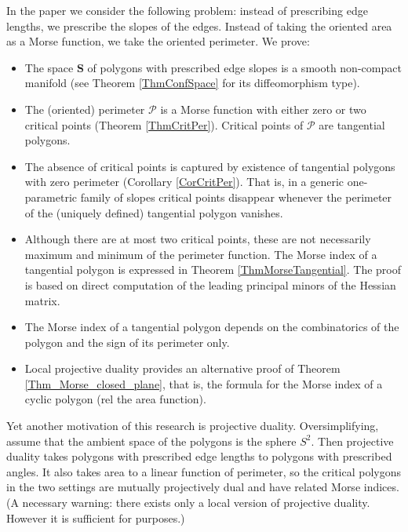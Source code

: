 \documentclass[12pt]{amsart}
\theoremstyle{plain}
\theoremstyle{definition}
\theoremstyle{remark}
\theoremstyle{plain}
\theoremstyle{definition}
\begin{document}
  In the paper we consider the following problem: instead of prescribing edge lengths, we prescribe the slopes of the edges. Instead of taking the oriented area as a Morse function, we take the oriented perimeter. We prove:
 \begin{itemize}
    \item The space $\mathbf{S}$ of polygons with prescribed edge slopes  is a smooth non-compact  manifold (see Theorem \ref{ThmConfSpace} for its diffeomorphism type).
    \item The (oriented) perimeter $\mathcal{P}$ is a Morse function with either zero or  two critical points (Theorem \ref{ThmCritPer}).
    Critical points of $\mathcal{P}$ are{ tangential} polygons.
    \item  The absence of critical points is captured by existence of tangential polygons with zero perimeter (Corollary  \ref{CorCritPer}). That is, in a generic one-parametric family of slopes critical points disappear whenever the perimeter of the (uniquely defined) tangential polygon vanishes.

        \item  Although there are at most two critical points, these are not necessarily maximum and minimum of the perimeter function. The Morse index of a tangential polygon is expressed in Theorem \ref{ThmMorseTangential}. The proof is based on  direct computation of the leading principal minors of the Hessian matrix.
            \item The Morse index of a tangential polygon depends on the combinatorics of the polygon and the sign of its perimeter only.
            \item Local projective duality provides an alternative proof of Theorem \ref{Thm_Morse_closed_plane}, that is, the formula for the Morse index of a cyclic polygon (rel the area function).
  \end{itemize}

  Yet another motivation of this research is projective duality. Oversimplifying, assume that  the ambient space of the polygons is the sphere $S^2$.
Then projective duality takes polygons with prescribed edge lengths to polygons with prescribed angles. It also takes area to a linear function of perimeter, so the critical polygons in the two settings are mutually projectively dual and have related Morse indices.
(A necessary warning:  there exists only  a local version of projective duality. However it is sufficient for purposes.)
\end{document}
